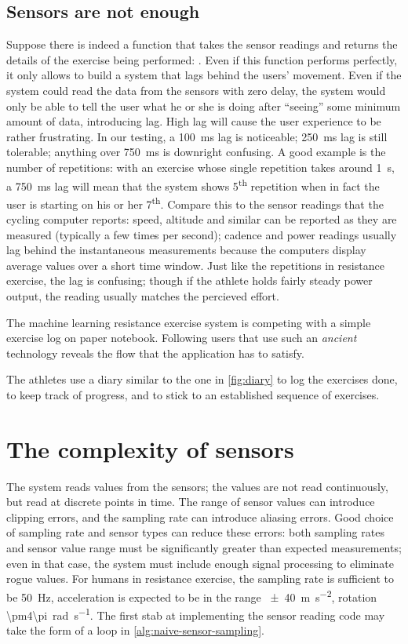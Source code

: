 \subsection{Sensors are not enough}
Suppose there is indeed a function that takes the sensor readings and returns the details of the exercise being performed: . Even if this function performs perfectly, it only allows to build a system that lags behind the users' movement. Even if the system could read the data from the sensors with zero delay, the system would only be able to tell the user what he or she is doing after ``seeing'' some minimum amount of data, introducing lag. High lag will cause the user experience to be rather frustrating. In our testing, a \SI{100}{\milli\second} lag is noticeable; \SI{250}{\milli\second} lag is still tolerable; anything over \SI{750}{\milli\second} is downright confusing. A good example is the number of repetitions: with an exercise whose single repetition takes around \SI{1}{\second}, a \SI{750}{\milli\second} lag will mean that the system shows 5\textsuperscript{th} repetition when in fact the user is starting on his or her 7\textsuperscript{th}. Compare this to the sensor readings that the cycling computer reports: speed, altitude and similar can be reported as they are measured (typically a few times per second); cadence and power readings usually lag behind the instantaneous measurements because the computers display average values over a short time window. Just like the repetitions in resistance exercise, the lag is confusing; though if the athlete holds fairly steady power output, the reading usually matches the percieved effort.

The machine learning resistance exercise system is competing with a simple exercise log on paper notebook. Following users that use such an \emph{ancient} technology reveals the flow that the application has to satisfy. 


The athletes use a diary similar to the one in \autoref{fig:diary} to log the exercises done, to keep track of progress, and to stick to an established sequence of exercises.

\section{The complexity of sensors}
The system reads values from the sensors; the values are not read continuously, but read at discrete points in time. The range of sensor values can introduce clipping errors, and the sampling rate can introduce aliasing errors. Good choice of sampling rate and sensor types can reduce these errors: both sampling rates and sensor value range must be significantly greater than expected measurements; even in that case, the system must include enough signal processing to eliminate rogue values. For humans in resistance exercise, the sampling rate is sufficient to be \SI{50}{\hertz}, acceleration is expected to be in the range \SI{\pm40}{\meter\second^{-2}}, rotation \SI{\pm4\pi}{\radian\second^{-1}}. The first stab at implementing the sensor reading code may take the form of a loop in \autoref{alg:naive-sensor-sampling}.

